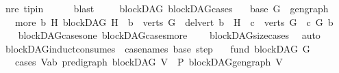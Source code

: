 \begin{isabellebody}
\ nre\ tip{\isacharunderscore}{\kern0pt}in\isanewline
\ \ \ \ \isamarkupfalse%
\ blast\ \isanewline
{}\isamarkupfalse%
%
\endisatagproof
{\isafoldproof}%
%
\isadelimproof
\ \isanewline
%
\endisadelimproof
\isanewline
\isanewline
{}\isamarkupfalse%
\ {\isacharparenleft}{\kern0pt}\ blockDAG{\isacharparenright}{\kern0pt}\ blockDAG{\isacharunderscore}{\kern0pt}cases{}{\isacharcolon}{\kern0pt}\isanewline
\ \ \ {\isacharparenleft}{\kern0pt}base{\isacharparenright}{\kern0pt}\ {\isachardoublequoteopen}{\isacharparenleft}{\kern0pt}G\ {\isacharequal}{\kern0pt}\ gen{\isacharunderscore}{\kern0pt}graph{\isacharparenright}{\kern0pt}{\isachardoublequoteclose}\isanewline
\ \ {\isacharbar}{\kern0pt}\ {\isacharparenleft}{\kern0pt}more{\isacharparenright}{\kern0pt}\ {\isachardoublequoteopen}{\isacharparenleft}{\kern0pt}{\isasymexists}b\ H{\isachardot}{\kern0pt}\ {\isacharparenleft}{\kern0pt}blockDAG\ H\ {\isasymand}\ b\ {\isasymin}\ verts\ G\ {\isasymand}\ del{\isacharunderscore}{\kern0pt}vert\ b\ {\isacharequal}{\kern0pt}\ H\ {\isasymand}\ {\isacharparenleft}{\kern0pt}{\isasymforall}c\ {\isasymin}\ verts\ G{\isachardot}{\kern0pt}\ {\isasymnot}\ c\ {\isasymrightarrow}\isactrlsup {\isacharplus}{\kern0pt}\isactrlbsub G\isactrlesub \ b{\isacharparenright}{\kern0pt}{\isacharparenright}{\kern0pt}{\isacharparenright}{\kern0pt}{\isachardoublequoteclose}\isanewline
%
\isadelimproof
\ \ %
\endisadelimproof
%
\isatagproof
{}\isamarkupfalse%
\ blockDAG{\isacharunderscore}{\kern0pt}cases{\isacharunderscore}{\kern0pt}one\ blockDAG{\isacharunderscore}{\kern0pt}cases{\isacharunderscore}{\kern0pt}more{}\isanewline
\ \ \ \ blockDAG{\isacharunderscore}{\kern0pt}size{\isacharunderscore}{\kern0pt}cases\ \isamarkupfalse%
\ auto%
\endisatagproof
{\isafoldproof}%
%
\isadelimproof
\isanewline
%
\endisadelimproof
\isanewline
{}\isamarkupfalse%
\ blockDAG{\isacharunderscore}{\kern0pt}induct{\isacharbrackleft}{\kern0pt}consumes\ {}{\isacharcomma}{\kern0pt}\ case{\isacharunderscore}{\kern0pt}names\ base\ step{\isacharbrackright}{\kern0pt}{\isacharcolon}{\kern0pt}\isanewline
\ \ \ fund{\isacharcolon}{\kern0pt}\ {\isachardoublequoteopen}blockDAG\ G{\isachardoublequoteclose}\isanewline
\ \ \ cases{\isacharcolon}{\kern0pt}\ {\isachardoublequoteopen}{\isasymAnd}V{\isacharcolon}{\kern0pt}{\isacharcolon}{\kern0pt}{\isacharparenleft}{\kern0pt}{\isacharprime}{\kern0pt}a{\isacharcomma}{\kern0pt}{\isacharprime}{\kern0pt}b{\isacharparenright}{\kern0pt}\ pre{\isacharunderscore}{\kern0pt}digraph{\isachardot}{\kern0pt}\ blockDAG\ V\ {\isasymLongrightarrow}\ P\ {\isacharparenleft}{\kern0pt}blockDAG{\isachardot}{\kern0pt}gen{\isacharunderscore}{\kern0pt}graph\ V{\isacharparenright}{\kern0pt}{\isachardoublequoteclose}\isanewline

\end{isabellebody}
